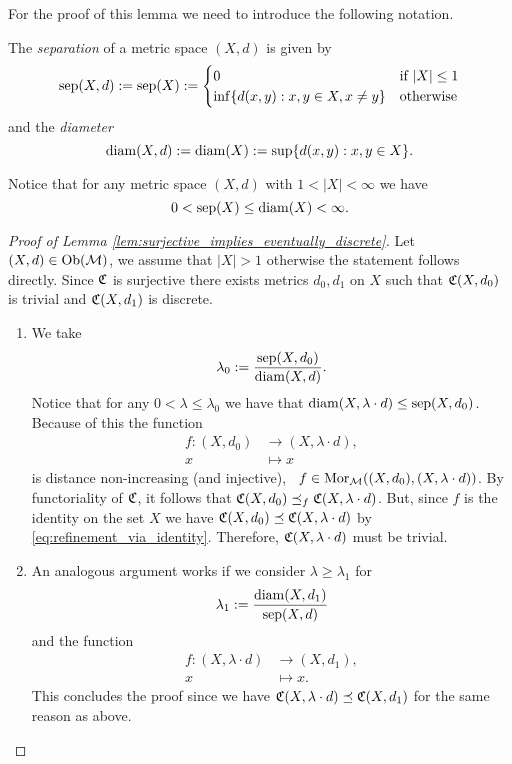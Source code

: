 For the proof of this lemma we need to introduce the following notation.

\begin{definition}{}{}
    The \emph{separation} of a metric space $(X,d)$ is given by
    \begin{equation*}
    \mathrm{sep}(X,d) := \mathrm{sep}(X) := \begin{cases}
        0 & \text{if } |X| \le 1\\
        \inf\{d(x,y): x,y \in X, x \neq y\} & \text{otherwise}
    \end{cases}
    \end{equation*}
    and the \emph{diameter}
    \begin{equation*}
    \mathrm{diam}(X,d) := \mathrm{diam}(X) := \sup\{d(x,y): x,y \in X\}.
    \end{equation*}
\end{definition}

Notice that for any metric space $(X,d)$ with $1 < |X| < \infty$ we have
$$
0 < \mathrm{sep}(X) \leq \mathrm{diam}(X) < \infty.
$$

\begin{proof}[Proof of Lemma \ref{lem:surjective_implies_eventually_discrete}]
    Let $(X,d) \in \mathrm {Ob}(\mathcal{M})$, we assume that $|X| > 1$ otherwise the statement follows directly. Since $\mathfrak{C}$ is surjective there exists metrics $d_0, d_1$ on $X$ such that $\mathfrak{C}(X,d_0)$ is trivial and $\mathfrak{C}(X,d_1)$ is discrete.
    \begin{enumerate}
        \item We take
        $$
        \lambda_0 := \frac{\mathrm{sep}(X,d_0)}{\mathrm{diam}(X,d)}.
        $$ 
        Notice that for any $0 < \lambda \le \lambda_0$ we have that $\mathrm{diam}(X,\lambda \cdot d) \le \mathrm{sep}(X,d_0)$. Because of this the function
        \begin{align*}
            f: (X, d_0) &\longrightarrow (X, \lambda \cdot d),\\
            x &\longmapsto x
        \end{align*}
        is distance non-increasing (and injective), \ie\ $f \in \mathrm {Mor}_{\mathcal{M}}((X,d_0), (X,\lambda \cdot d))$.
        By functoriality of $\mathfrak{C}$, it follows that $\mathfrak{C}(X,d_0) \preceq_f \mathfrak{C}(X,\lambda \cdot d)$. But, since $f$ is the identity on the set $X$ we have $\mathfrak{C}(X,d_0) \preceq \mathfrak{C}(X,\lambda \cdot d)$ by \eqref{eq:refinement_via_identity}. Therefore, $\mathfrak{C}(X,\lambda \cdot d)$ must be trivial.

        \item An analogous argument works if we consider $\lambda \ge \lambda_1$ for
        $$
        \lambda_1 := \frac{\mathrm{diam}(X,d_1)}{\mathrm{sep}(X,d)}
        $$
        and the function
        \begin{align*}
            f: (X, \lambda \cdot d) &\longrightarrow (X, d_1),\\
            x &\longmapsto x.
        \end{align*}
        This concludes the proof since we have $\mathfrak{C}(X,\lambda \cdot d) \preceq \mathfrak{C}(X,d_1)$ for the same reason as above.
    \end{enumerate}
\end{proof}


